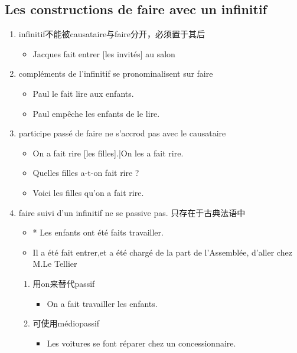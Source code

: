\documentclass[UTF8]{report}
\begin{document}
\subsection{Les constructions de faire avec un infinitif}
\begin{enumerate}
    \item infinitif不能被causataire与faire分开，必须置于其后
    \begin{itemize}
        \item Jacques fait entrer [les invités] au salon
    \end{itemize}
    \item compléments de l’infinitif se pronominalisent sur faire
    \begin{itemize}
        \item Paul le fait lire aux enfants.
        \item Paul empêche les enfants de le lire.
    \end{itemize}
    \item participe passé de faire ne s'accrod pas avec le causataire
    \begin{itemize}
        \item On a fait rire [les filles].|On les a fait rire.
        \item Quelles filles a-t-on fait rire ?
        \item Voici les filles qu’on a fait rire.
    \end{itemize}
    \item faire suivi d’un infinitif ne se passive pas. 只存在于古典法语中
    \begin{itemize}
        \item * Les enfants ont été faits travailler.
        \item Il a été fait entrer,et a été chargé de la part de l’Assemblée, d’aller chez M.Le Tellier
    \end{itemize}
    \begin{enumerate}
        \item 用on来替代passif
        \begin{itemize}
            \item On a fait travailler les enfants.
        \end{itemize}
        \item 可使用médiopassif
        \begin{itemize}
            \item Les voitures se font réparer chez un concessionnaire.
        \end{itemize}
    \end{enumerate}
\end{enumerate}
\end{document}

